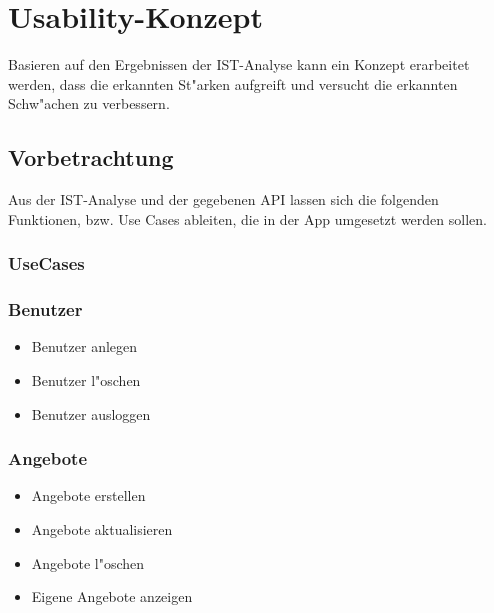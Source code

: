 \section{Usability-Konzept}

Basieren auf den Ergebnissen der IST-Analyse kann ein Konzept erarbeitet werden, dass die erkannten St"arken aufgreift und versucht die erkannten Schw"achen zu verbessern.

\subsection{Vorbetrachtung}

Aus der IST-Analyse und der gegebenen API lassen sich die folgenden Funktionen, bzw. Use Cases ableiten, die in der App umgesetzt werden sollen.

\subsubsection{UseCases}

\subsubsection*{Benutzer}
\begin{itemize}
\item Benutzer anlegen \vspace{-0,2cm}
\item Benutzer l"oschen \vspace{-0,2cm}
\item Benutzer ausloggen \vspace{-0,2cm}
\end{itemize}

\subsubsection*{Angebote}
\begin{itemize}
\item Angebote erstellen \vspace{-0,2cm}
\item Angebote aktualisieren  \vspace{-0,2cm}
\item Angebote l"oschen \vspace{-0,2cm}
\item Eigene Angebote anzeigen \vspace{-0,2cm}
\end{itemize}

